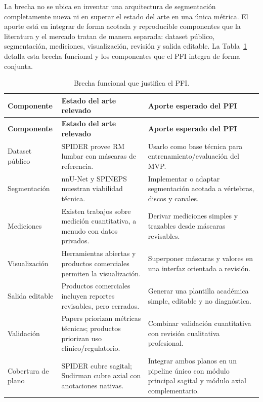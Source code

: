 La brecha no se ubica en inventar una arquitectura de segmentación completamente nueva ni en superar el estado del arte en una única métrica. El aporte está en integrar de forma acotada y reproducible componentes que la literatura y el mercado tratan de manera separada: dataset público, segmentación, mediciones, visualización, revisión y salida editable. La Tabla~\ref{tab:estado-arte-brecha} detalla esta brecha funcional y los componentes que el PFI integra de forma conjunta.

\begingroup
\small
\sloppy
\setlength{\emergencystretch}{3em}
\setlength{\tabcolsep}{3pt}
\setlength{\LTleft}{0pt}
\setlength{\LTright}{0pt}
\renewcommand{\arraystretch}{1.15}
\begin{longtable}{|>{\raggedright\arraybackslash}p{}|>{\raggedright\arraybackslash}p{}|>{\raggedright\arraybackslash}p{}|}
\caption{Brecha funcional que justifica el PFI.}
\label{tab:estado-arte-brecha}\\
\hline
\textbf{Componente} & \textbf{Estado del arte relevado} & \textbf{Aporte esperado del PFI} \\
\hline
\endfirsthead
\hline
\textbf{Componente} & \textbf{Estado del arte relevado} & \textbf{Aporte esperado del PFI} \\
\hline
\endhead
Dataset público & SPIDER provee RM lumbar con máscaras de referencia. & Usarlo como base técnica para entrenamiento/evaluación del MVP. \\
\hline
Segmentación & nnU-Net y SPINEPS muestran viabilidad técnica. & Implementar o adaptar segmentación acotada a vértebras, discos y canales. \\
\hline
Mediciones & Existen trabajos sobre medición cuantitativa, a menudo con datos privados. & Derivar mediciones simples y trazables desde máscaras revisables. \\
\hline
Visualización & Herramientas abiertas y productos comerciales permiten la visualización. & Superponer máscaras y valores en una interfaz orientada a revisión. \\
\hline
Salida editable & Productos comerciales incluyen reportes revisables, pero cerrados. & Generar una plantilla académica simple, editable y no diagnóstica. \\
\hline
Validación & Papers priorizan métricas técnicas; productos priorizan uso clínico/regulatorio. & Combinar validación cuantitativa con revisión cualitativa profesional. \\
\hline
Cobertura de plano & SPIDER cubre sagital; Sudirman cubre axial con anotaciones nativas. & Integrar ambos planos en un pipeline único con módulo principal sagital y módulo axial complementario. \\
\hline
\end{longtable}
\endgroup

